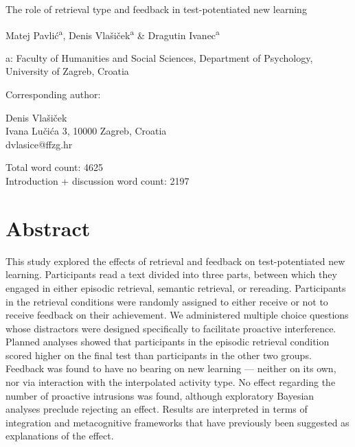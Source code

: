 \documentclass[12pt]{article}
\newcommand\specialsection{%
    \titleformat{\section}{\centering\normalsize\rmfamily}{}{0pt}{}
}
\def\biblio{}
\begin{document}
\begin{titlepage}
    \begin{center}

        \vspace*{\fill}

        The role of retrieval type and feedback in test-potentiated 
        new learning

        \bigskip
        Matej Pavlić\textsuperscript{a}, Denis Vlašiček\textsuperscript{a} 
        \& Dragutin Ivanec\textsuperscript{a}

        a: Faculty of Humanities and Social Sciences, Department of 
        Psychology, University of Zagreb, Croatia

        \bigskip

        \raggedright
        Corresponding author:

        Denis Vlašiček\\
        Ivana Lučića 3, 10000 Zagreb, Croatia\\
        dvlasice@ffzg.hr

		\bigskip
		\bigskip
		Total word count: 4625\\
		Introduction + discussion word count: 2197
		
        \vspace*{\fill}

    \end{center}

\end{titlepage}

\def\biblio{}

\specialsection

\section{Abstract}

This study explored the effects of retrieval and feedback on 
test-potentiated new learning. Participants read a text divided into three 
parts, between which they engaged in either episodic retrieval, semantic 
retrieval, or rereading. Participants in the retrieval conditions were 
randomly assigned to either receive or not to receive feedback on their 
achievement. We administered multiple choice questions whose distractors 
were designed specifically to facilitate proactive interference. Planned 
analyses showed that participants in the episodic retrieval condition scored 
higher on the final test than participants in the other two groups. Feedback 
was found to have no bearing on new learning --- neither on its own, nor via 
interaction with the interpolated activity type. No effect regarding the 
number of proactive intrusions was found, although exploratory Bayesian 
analyses preclude rejecting an effect. Results are interpreted in terms of 
integration and metacognitive frameworks that have previously been suggested 
as explanations of the effect.
\end{document}
